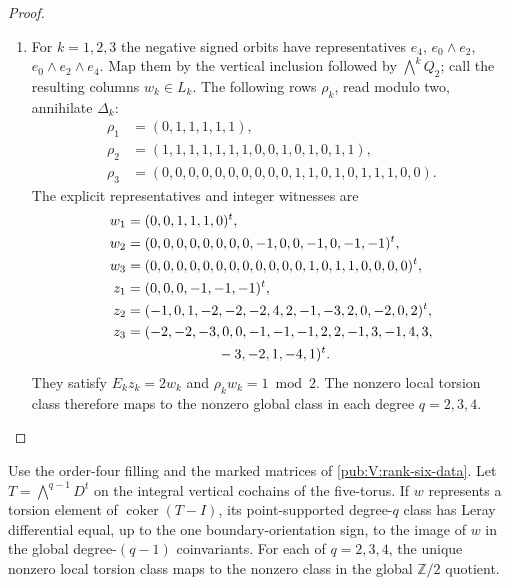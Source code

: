 \begin{proof}
\begin{enumerate}[label=\arabic*.,leftmargin=*]
\item For $k=1,2,3$ the negative signed orbits have representatives
$e_4$, $e_0\wedge e_2$, $e_0\wedge e_2\wedge e_4$.
Map them by the vertical inclusion followed by $\bigwedge^kQ_2$;
call the resulting columns $w_k\in L_k$.
The following rows $\rho_k$, read modulo two, annihilate
$\Delta_k$:
\[
\begin{aligned}
\rho_1&=(0,1,1,1,1,1),\\
\rho_2&=(1,1,1,1,1,1,1,0,0,1,0,1,0,1,1),\\
\rho_3&=(0,0,0,0,0,0,0,0,0,0,1,1,0,1,0,1,1,1,0,0).
\end{aligned}
\]
The explicit representatives and integer witnesses are
\[
\begin{aligned}
w_1&=(0,0,1,1,1,0)^t,\\
w_2&=(0,0,0,0,0,0,0,0,-1,0,0,-1,0,-1,-1)^t,\\
w_3&=(0,0,0,0,0,0,0,0,0,0,0,0,1,0,1,1,0,0,0,0)^t,\\
z_1&=(0,0,0,-1,-1,-1)^t,\\
z_2&=(-1,0,1,-2,-2,-2,4,2,-1,-3,2,0,-2,0,2)^t,\\
z_3&=(-2,-2,-3,0,0,-1,-1,-1,2,2,-1,3,-1,4,3,\\
   &\hspace{23mm}-3,-2,1,-4,1)^t.
\end{aligned}
\]
They satisfy $E_kz_k=2w_k$ and $\rho_kw_k=1\bmod2$.
The nonzero local torsion class therefore maps to the nonzero global
class in each degree $q=2,3,4$.

\end{enumerate}
\end{proof}

\begin{lemma}
\hypertarget{tag-02QF}{}\label{mapsaudit:order-four-torsion-transgression}

Use the order-four filling and the marked matrices of \cref{pub:V:rank-six-data}.
Let $T=\bigwedge^{q-1}D^t$ on the integral vertical cochains of the
five-torus. If $w$ represents a torsion element of
$\operatorname{coker}(T-I)$, its point-supported degree-$q$ class has
Leray differential equal, up to the one boundary-orientation sign, to
the image of $w$ in the global degree-$(q-1)$ coinvariants.  For each of $q=2,3,4$, the unique nonzero local torsion class maps
to the nonzero class in the global $\mathbb Z/2$ quotient.
\end{lemma}


